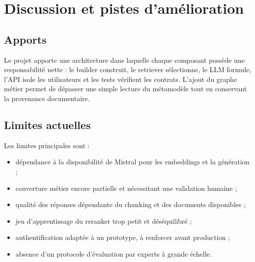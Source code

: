 \documentclass[12pt,a4paper,oneside]{report}
\begin{document}
\chapter{Discussion et pistes d'amélioration}

\section{Apports}
Le projet apporte une architecture dans laquelle chaque composant possède une responsabilité nette : le builder construit, le retriever sélectionne, le LLM formule, l'API isole les utilisateurs et les tests vérifient les contrats. L'ajout du graphe métier permet de dépasser une simple lecture du métamodèle tout en conservant la provenance documentaire.

\section{Limites actuelles}
Les limites principales sont :
\begin{itemize}
  \item dépendance à la disponibilité de Mistral pour les embeddings et la génération ;
  \item couverture métier encore partielle et nécessitant une validation humaine ;
  \item qualité des réponses dépendante du chunking et des documents disponibles ;
  \item jeu d'apprentissage du reranker trop petit et déséquilibré ;
  \item authentification adaptée à un prototype, à renforcer avant production ;
  \item absence d'un protocole d'évaluation par experts à grande échelle.
\end{itemize}
\end{document}
